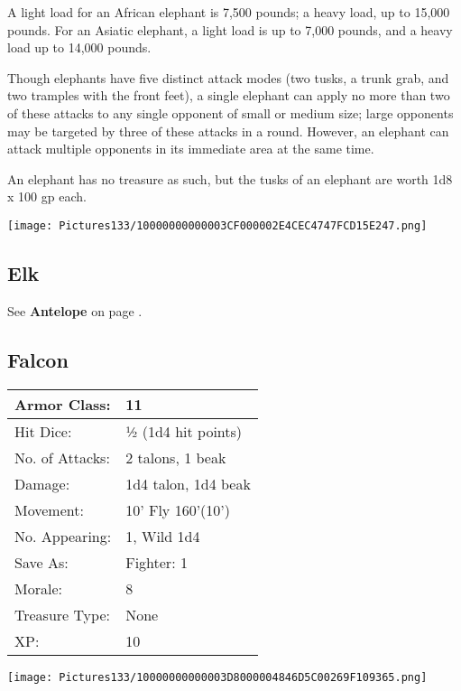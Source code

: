 \documentclass[a4paper,twoside,openany,10pt]{book}
\begin{document}
\begin{multicols}{2}
A light load for an African elephant is 7,500 pounds; a heavy load, up to 15,000 pounds. For an Asiatic elephant, a light load is up to 7,000 pounds, and a heavy load up to 14,000 pounds.

Though elephants have five distinct attack modes (two tusks, a trunk grab, and two tramples with the front feet), a single elephant can apply no more than two of these attacks to any single opponent of small or medium size; large opponents may be targeted by three of these attacks in a round. However, an elephant can attack multiple opponents in its immediate area at the same time.

An elephant has no treasure as such, but the tusks of an elephant are worth 1d8 x 100 gp each.\medskip

\begin{center}
	\texttt{[image: Pictures133/10000000000003CF000002E4CEC4747FCD15E247.png]}
\end{center}

\subsection*{Elk}\label{elk}

See \textbf{Antelope} on page \hyperlink{antelope}{\pageref{antelope}}.

\subsection*{Falcon}\label{falcon}

\begin{tabularx}{0.48\textwidth}{@{}lX@{}}
Armor Class: & 11 \\\hline
Hit Dice: & ½ (1d4 hit points) \\\hline
No. of Attacks: & 2 talons, 1 beak \\\hline
Damage: & 1d4 talon, 1d4 beak \\\hline
Movement: & 10' Fly 160'(10') \\\hline
No. Appearing: & 1, Wild 1d4 \\\hline
Save As: & Fighter: 1 \\\hline
Morale: & 8 \\\hline
Treasure Type: & None \\\hline
XP: & 10 \\\hline
\end{tabularx}\medskip


\begin{center}
	\texttt{[image: Pictures133/10000000000003D8000004846D5C00269F109365.png]}
\end{center}


\end{multicols}
\end{document}
